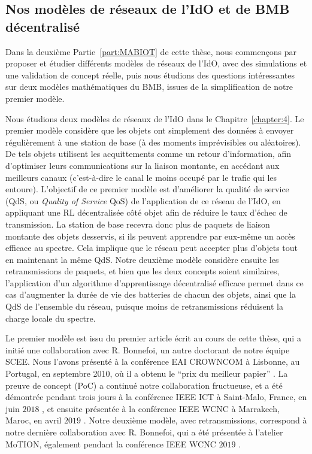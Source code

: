 \begin{resume_fr}
\subsection*{Nos modèles de réseaux de l'IdO et de BMB décentralisé}

Dans la deuxième Partie~\ref{part:MABIOT} de cette thèse, nous commençons par proposer et étudier différents modèles de réseaux de l'IdO, avec des simulations et une validation de concept réelle, puis nous étudions des questions intéressantes sur deux modèles mathématiques du BMB, issues de la simplification de notre premier modèle.


%
Nous étudions deux modèles de réseaux de l'IdO dans le Chapitre~\ref{chapter:4}.
Le premier modèle considère que les objets ont simplement des données à envoyer régulièrement à une station de base (à des moments imprévisibles ou aléatoires).
De tels objets utilisent les acquittements comme un retour d'information, afin d'optimiser leurs communications sur la liaison montante, en accédant aux meilleurs canaux (c'est-à-dire le canal le moins occupé par le trafic qui les entoure).
L'objectif de ce premier modèle est d'améliorer la qualité de service (QdS, ou \emph{Quality of Service} QoS) de l'application de ce réseau de l'IdO, en appliquant une RL décentralisée côté objet afin de réduire le taux d'échec de transmission.
La station de base recevra donc plus de paquets de liaison montante des objets desservis, si ils peuvent apprendre par eux-même un accès efficace au spectre.
Cela implique que le réseau peut accepter plus d'objets tout en maintenant la même QdS.
%
Notre deuxième modèle considère ensuite les retransmissions de paquets, et bien que les deux concepts soient similaires, l'application d'un algorithme d'apprentissage décentralisé efficace permet dans ce cas d'augmenter la durée de vie des batteries de chacun des objets, ainsi que la QdS de l'ensemble du réseau, puisque moins de retransmissions réduisent la charge locale du spectre.

Le premier modèle est issu du premier article écrit au cours de cette thèse, qui a initié une collaboration avec R. Bonnefoi, un autre doctorant de notre équipe SCEE.
Nous l'avons présenté à la conférence EAI CROWNCOM à Lisbonne, au Portugal, en septembre 2010, où il a obtenu le ``prix du meilleur papier'' \cite{Bonnefoi17}.
%
La preuve de concept (PoC) a continué notre collaboration fructueuse, et a été démontrée pendant trois jours à la conférence IEEE ICT à Saint-Malo, France, en juin $2018$ \cite{Besson2018ICT}, et ensuite présentée à la conférence IEEE WCNC à Marrakech, Maroc, en avril $2019$ \cite{Besson2019WCNC}.
%
Notre deuxième modèle, avec retransmissions, correspond à notre dernière collaboration avec R. Bonnefoi, qui a été présentée à l'atelier MoTION, également pendant la conférence IEEE WCNC $2019$ \cite{Bonnefoi2019WCNC}.



\end{resume_fr}
